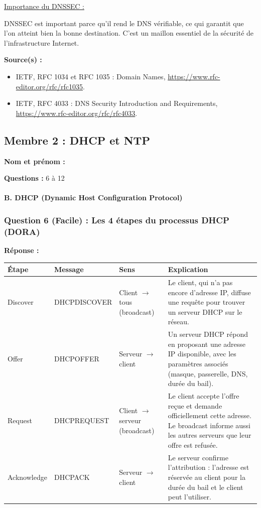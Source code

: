 \documentclass[12pt,a4paper]{article}
\newcommand{\membre}[2]{%
  \textbf{Nom et prénom :} #1 \par
  \textbf{Questions :} #2 \par
}
\newcommand{\reponse}{\textbf{Réponse :}\par}
\newcommand{\sources}{\textbf{Source(s) :}}
\newcommand{\fl}{\ensuremath{\rightarrow}}
\begin{document}
\underline{Importance du DNSSEC :}

DNSSEC est important parce qu'il rend le DNS vérifiable, ce qui garantit
que l'on atteint bien la bonne destination. C'est un maillon essentiel
de la sécurité de l'infrastructure Internet.

\sources
\begin{itemize}
    \item IETF, RFC 1034 et RFC 1035 : Domain Names,
    \url{https://www.rfc-editor.org/rfc/rfc1035}.
    \item IETF, RFC 4033 : DNS Security Introduction and Requirements,
    \url{https://www.rfc-editor.org/rfc/rfc4033}.
\end{itemize}

\subsection{Membre 2 : DHCP et NTP}
\membre{\dotfill}{6 à 12}

\paragraph{B. DHCP (Dynamic Host Configuration Protocol)}

\subsubsection*{Question 6 (Facile) : Les 4 étapes du processus DHCP (DORA)}

\reponse
\begin{longtable}{|L{2.4cm}|L{2.9cm}|L{2.9cm}|L{6.4cm}|}
\hline
\textbf{Étape} & \textbf{Message} & \textbf{Sens} & \textbf{Explication} \\ \hline
\endhead
Discover & DHCPDISCOVER & Client \fl{} tous (broadcast) &
Le client, qui n'a pas encore d'adresse IP, diffuse une requête pour
trouver un serveur DHCP sur le réseau. \\ \hline
Offer & DHCPOFFER & Serveur \fl{} client &
Un serveur DHCP répond en proposant une adresse IP disponible, avec les
paramètres associés (masque, passerelle, DNS, durée du bail). \\ \hline
Request & DHCPREQUEST & Client \fl{} serveur (broadcast) &
Le client accepte l'offre reçue et demande officiellement cette adresse.
Le broadcast informe aussi les autres serveurs que leur offre est
refusée. \\ \hline
Acknowledge & DHCPACK & Serveur \fl{} client &
Le serveur confirme l'attribution : l'adresse est réservée au client
pour la durée du bail et le client peut l'utiliser. \\ \hline
\end{longtable}
\end{document}
